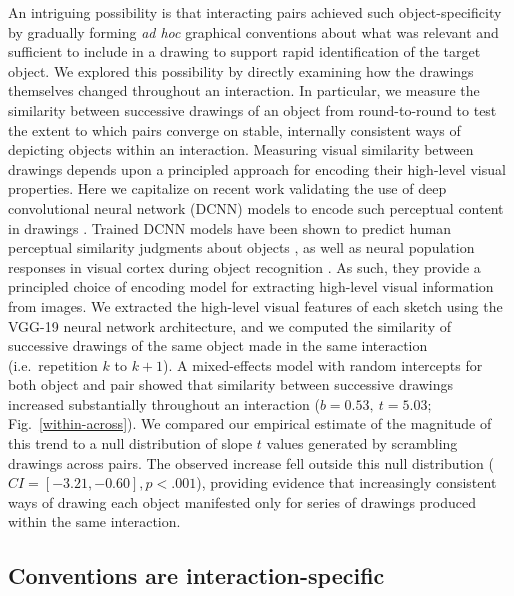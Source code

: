 \documentclass[11pt,letterpaper]{article}
\begin{document}
An intriguing possibility is that interacting pairs achieved such object-specificity by gradually forming \textit{ad hoc} graphical conventions about what was relevant and sufficient to include in a drawing to support rapid identification of the target object.
We explored this possibility by directly examining how the drawings themselves changed throughout an interaction.
In particular, we measure the similarity between successive drawings of an object from round-to-round to test the extent to which pairs converge on stable, internally consistent ways of depicting objects within an interaction.
Measuring visual similarity between drawings depends upon a principled approach for encoding their high-level visual properties.
Here we capitalize on recent work validating the use of deep convolutional neural network (DCNN) models to encode such perceptual content in drawings \cite{FanCommon2018}.
Trained DCNN models have been shown to predict human perceptual similarity judgments about objects \cite{kubilius2016deep,peterson2018evaluating}, as well as neural population responses in visual cortex during object recognition \cite{yamins2014performance,gucclu2015deep}.
As such, they provide a principled choice of encoding model for extracting high-level visual information from images.
We extracted the high-level visual features of each sketch using the VGG-19 neural network architecture, and we computed the similarity of successive drawings of the same object made in the same interaction (i.e.~repetition $k$ to $k+1$). 
A mixed-effects model with random intercepts for both object and pair showed that similarity between successive drawings increased substantially throughout an interaction ($b = 0.53,~t = 5.03$; Fig.~\ref{within-across}).
We compared our empirical estimate of the magnitude of this trend to a null distribution of slope $t$ values generated by scrambling drawings across pairs. 
The observed increase fell outside this null distribution ($CI = [-3.21, -0.60], p < .001$), providing evidence that increasingly consistent ways of drawing each object manifested only for series of drawings produced within the same interaction.

\subsection{Conventions are interaction-specific}
\end{document}
